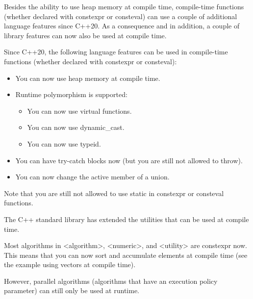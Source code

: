 
Besides the ability to use heap memory at compile time, compile-time functions (whether declared with constexpr or consteval) can use a couple of additional language features since C++20. As a consequence and in addition, a couple of library features can now also be used at compile time.


Since C++20, the following language features can be used in compile-time functions (whether declared with constexpr or consteval):

\begin{itemize}
\item 
You can now use heap memory at compile time.

\item 
Runtime polymorphism is supported:

\begin{itemize}
\item 
You can now use virtual functions.

\item 
You can now use dynamic\_cast.

\item 
You can now use typeid.
\end{itemize}

\item
You can have try-catch blocks now (but you are still not allowed to throw).

\item
You can now change the active member of a union.
\end{itemize}

Note that you are still not allowed to use static in constexpr or consteval functions.



The C++ standard library has extended the utilities that can be used at compile time.


Most algorithms in <algorithm>, <numeric>, and <utility> are constexpr now. This means that you can now sort and accumulate elements at compile time (see the example using vectors at compile time).

However, parallel algorithms (algorithms that have an execution policy parameter) can still only be used at runtime.


